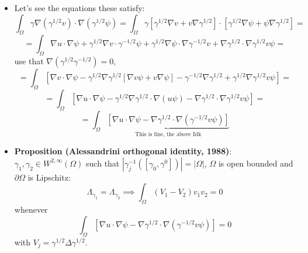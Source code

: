 \documentclass{article}
\begin{document}
\begin{itemize}
    \item Let's see the equations these satisfy:
    \begin{equation}
        \int_{\Omega} \gamma \nabla (\gamma^{1/2} v) \cdot \nabla (\gamma^{1/2} \psi) = \int_\Omega \gamma [\gamma^{1/2} \nabla v + v \nabla \gamma^{1/2}] \cdot [\gamma^{1/2} \nabla \psi + \psi \nabla \gamma^{1/2}] = 
    \end{equation}
    \begin{equation}
        = \int_\Omega \nabla u \cdot \nabla \psi + \gamma^{1/2} \nabla v \cdot \gamma^{-1/2} \psi + \gamma^{1/2} \nabla \psi \cdot \nabla \gamma^{-1/2} v + \nabla \gamma^{1/2} \cdot \nabla \gamma^{1/2} v \psi =
    \end{equation}
    use that $\nabla (\gamma^{1/2} \gamma^{-1/2}) = 0$,
    \begin{equation}
        = \int_\Omega [\nabla v \cdot \nabla \psi - \gamma^{1/2} \nabla \gamma^{1/2} [\nabla v \psi + v \nabla \psi] - \gamma^{- 1/2} \nabla \gamma^{1/2} + \gamma^{1/2} \nabla \gamma^{1/2} v \psi] = 
    \end{equation}
    \begin{equation}
        = \int_\Omega [\nabla u \cdot \nabla \psi - \gamma^{1/2} \nabla \gamma^{1/2} \cdot \nabla (u\psi) - \nabla \gamma^{1/2} \cdot \nabla \gamma^{1/2} v \psi]=
    \end{equation}
    \begin{equation}
        = \int_\Omega \underbrace{[\nabla u \cdot \nabla \psi - \nabla \gamma^{1/2} \cdot \nabla (\gamma^{-1/2} v \psi)]}_{\text{This is fine, the above Idk}}
    \end{equation}

    \item \textbf{Proposition (Alessandrini orthogonal identity, 1988)}: $\gamma_1, \gamma_2 \in W^{2, \infty}(\Omega)$ such that $|\gamma_j^{-1}([\gamma_0, \gamma^0]) |  = |\Omega|$, $\Omega$ is open bounded and $\partial \Omega$ is Lipschitz:
    \begin{equation}\label{first-integral-formula}
        \Lambda_{\gamma_1}= \Lambda_{\gamma_2} \implies \int_\Omega (V_1 - V_2 )v_1 v_2 = 0
    \end{equation}
    whenever
    \begin{equation}
        \int_\Omega [\nabla u \cdot \nabla \psi - \nabla \gamma^{1/2} \cdot \nabla (\gamma^{-1/2} v \psi)] = 0
    \end{equation}
    with $V_j = \gamma^{1/2} \Delta \gamma^{1/2}$.


\end{itemize}
\end{document}
